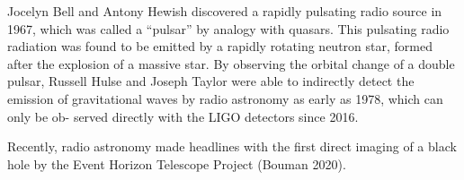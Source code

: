 Jocelyn Bell and Antony Hewish discovered a rapidly pulsating radio source in
1967, which was called a “pulsar” by analogy with quasars. This pulsating radio
radiation was found to be emitted by a rapidly rotating neutron star, formed after
the explosion of a massive star. By observing the orbital change of a double pulsar,
Russell Hulse and Joseph Taylor were able to indirectly detect the emission of
gravitational waves by radio astronomy as early as 1978, which can only be ob-
served directly with the LIGO detectors since 2016.

Recently, radio astronomy made headlines with the first direct imaging of a
black hole by the Event Horizon Telescope Project (Bouman 2020).

